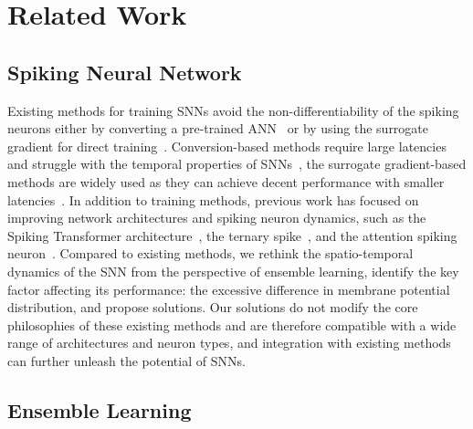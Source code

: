 \section{Related Work}
\vspace{-0.1cm}
\subsection{Spiking Neural Network}
\vspace{-0.1cm}
Existing methods for training SNNs avoid the non-differentiability of the spiking neurons either by converting a pre-trained ANN~\citep{rueckauer2017conversion} or by using the surrogate gradient for direct training~\citep{STBP}. Conversion-based methods require large latencies and struggle with the temporal properties of SNNs~\citep{deng2021optimal,bu2022optimal,you2024spikeziptf}, the surrogate gradient-based methods are widely used as they can achieve decent performance with smaller latencies~\citep{taylor2023addressing,TSSD,hu2024highperformance}. In addition to training methods, previous work has focused on improving network architectures and spiking neuron dynamics, such as the Spiking Transformer architecture~\citep{yao2023spikedriven,Shi_2024_CVPR}, the ternary spike~\citep{guo2024ternary}, and the attention spiking neuron~\citep{ding2023improved}. Compared to existing methods, we rethink the spatio-temporal dynamics of the SNN from the perspective of ensemble learning, identify the key factor affecting its performance: the excessive difference in membrane potential distribution, and propose solutions. Our solutions do not modify the core philosophies of these existing methods and are therefore compatible with a wide range of architectures and neuron types, and integration with existing methods can further unleash the potential of SNNs.

\vspace{-0.1cm}
\subsection{Ensemble Learning}
\vspace{-0.1cm}

